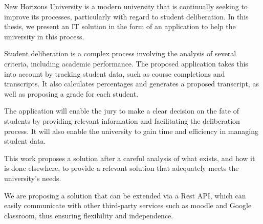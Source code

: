 New Horizons University is a modern university that is continually seeking to improve its processes, particularly with regard to student deliberation. In this thesis, we present an IT solution in the form of an application to help the university in this process.

Student deliberation is a complex process involving the analysis of several criteria, including academic performance. The proposed application takes this into account by tracking student data, such as course completions and transcripts. It also calculates percentages and generates a proposed transcript, as well as proposing a grade for each student.

The application will enable the jury to make a clear decision on the fate of students by providing relevant information and facilitating the deliberation process. It will also enable the university to gain time and efficiency in managing student data.

This work proposes a solution after a careful analysis of what exists, and how it is done elsewhere, to provide a relevant solution that adequately meets the university's needs.

We are proposing a solution that can be extended via a Rest API, which can easily communicate with other third-party services such as moodle and Google classroom, thus ensuring flexibility and independence.